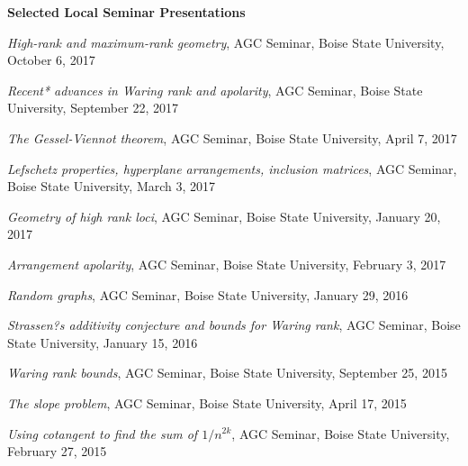 \documentclass[12pt]{article}
\begin{document}
\textbf{Selected Local Seminar Presentations}
\begin{description}
\setlength{}
\item[] \textit{High-rank and maximum-rank geometry},
AGC Seminar, Boise State University, October 6, 2017
\item[] \textit{Recent* advances in Waring rank and apolarity},
AGC Seminar, Boise State University, September 22, 2017
\item[] \textit{The Gessel-Viennot theorem},
AGC Seminar, Boise State University, April 7, 2017
\item[] \textit{Lefschetz properties, hyperplane arrangements, inclusion matrices},
AGC Seminar, Boise State University, March 3, 2017
\item[] \textit{Geometry of high rank loci},
AGC Seminar, Boise State University, January 20, 2017
\item[] \textit{Arrangement apolarity},
AGC Seminar, Boise State University, February 3, 2017
\item[] \textit{Random graphs},
AGC Seminar, Boise State University, January 29, 2016
\item[] \textit{Strassen?s additivity conjecture and bounds for Waring rank},
AGC Seminar, Boise State University, January 15, 2016
\item[] \textit{Waring rank bounds},
AGC Seminar, Boise State University, September 25, 2015
\item[] \textit{The slope problem},
AGC Seminar, Boise State University, April 17, 2015
\item[] \textit{Using cotangent to find the sum of $1/n^{2k}$},
AGC Seminar, Boise State University, February 27, 2015

\end{description}
\end{document}
